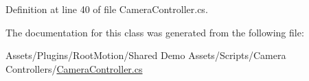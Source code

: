 Definition at line 40 of file Camera\+Controller.\+cs.



The documentation for this class was generated from the following file\+:\begin{DoxyCompactItemize}
\item 
Assets/\+Plugins/\+Root\+Motion/\+Shared Demo Assets/\+Scripts/\+Camera Controllers/\mbox{\hyperlink{_plugins_2_root_motion_2_shared_01_demo_01_assets_2_scripts_2_camera_01_controllers_2_camera_controller_8cs}{Camera\+Controller.\+cs}}\end{DoxyCompactItemize}
